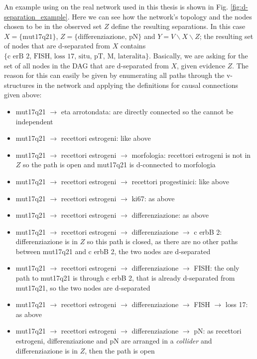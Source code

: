 An example using on the real network used in this thesis is shown in Fig. \ref{fig:d-separation_example}.
Here we can see how the network's topology and the nodes chosen to be in the observed set $Z$ define the resulting separations.
In this case $X= \{ \text{mut17q21} \}$, $Z= \{ \text{differenziazione, pN} \}$ and $Y=V \smallsetminus X \smallsetminus Z$; the resulting set of nodes that are d-separated from $X$ contains $\{ \text{c erB 2, FISH, loss 17, situ, pT, M, lateralita} \}$.
Basically, we are asking for the set of all nodes in the DAG that are d-separated from $X$, given evidence $Z$.
The reason for this can easily be given by enumerating all paths through the v-structures in the network and applying the definitions for causal connections given above:
\begin{itemize}
  \item mut17q21 $\rightarrow$ eta arrotondata: are directly connected so the cannot be independent
  \item mut17q21 $\rightarrow$ recettori estrogeni: like above
  \item mut17q21 $\rightarrow$ recettori estrogeni $\rightarrow$ morfologia: recettori estrogeni is not in $Z$ so the path is open and mut17q21 is d-connected to morfologia
  \item mut17q21 $\rightarrow$ recettori estrogeni $\rightarrow$ recettori progestinici: like above
  \item mut17q21 $\rightarrow$ recettori estrogeni $\rightarrow$ ki67: as above
  \item mut17q21 $\rightarrow$ recettori estrogeni $\rightarrow$ differenziazione: as above
  \item mut17q21 $\rightarrow$ recettori estrogeni $\rightarrow$ differenziazione $\rightarrow$ c erbB 2: differenziazione is in $Z$ so this path is closed, as there are no other paths between mut17q21 and c erbB 2, the two nodes are d-separated
  \item mut17q21 $\rightarrow$ recettori estrogeni $\rightarrow$ differenziazione $\rightarrow$ FISH: the only path to mut17q21 is through c erbB 2, that is already d-separated from mut17q21, so the two nodes are d-separated
  \item mut17q21 $\rightarrow$ recettori estrogeni $\rightarrow$ differenziazione $\rightarrow$ FISH $\rightarrow$ loss 17: as above
  \item mut17q21 $\rightarrow$ recettori estrogeni $\rightarrow$ differenziazione $\rightarrow$ pN: as recettori estrogeni, differenziazione and pN are arranged in a \textit{collider} and differenziazione is in $Z$, then the path is open

\end{itemize}
